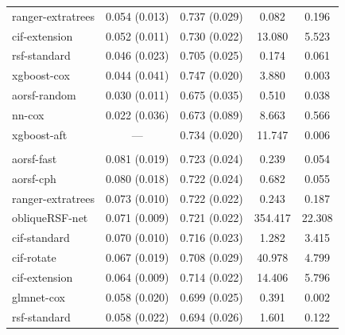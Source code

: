\documentclass[12pt]{article}\usepackage[]{graphicx}\usepackage[]{xcolor}
\newenvironment{knitrout}{}{} %
\begin{document}
\begin{knitrout}
\begin{longtable}[t]{lcccc}
\hspace{1em}ranger-extratrees & 0.054 (0.013) & 0.737 (0.029) & 0.082 & 0.196\\
\hspace{1em}cif-extension & 0.052 (0.011) & 0.730 (0.022) & 13.080 & 5.523\\
\hspace{1em}rsf-standard & 0.046 (0.023) & 0.705 (0.025) & 0.174 & 0.061\\
\hspace{1em}xgboost-cox & 0.044 (0.041) & 0.747 (0.020) & 3.880 & 0.003\\
\hspace{1em}aorsf-random & 0.030 (0.011) & 0.675 (0.035) & 0.510 & 0.038\\
\hspace{1em}nn-cox & 0.022 (0.036) & 0.673 (0.089) & 8.663 & 0.566\\
\hspace{1em}xgboost-aft & --- & 0.734 (0.020) & 11.747 & 0.006\\
\addlinespace[0.3em]
\multicolumn{5}{l}{\textit{\textbf{GUIDE-IT; HF hospitalization, n = 894, p = 59}}}\\
\hline
\hspace{1em}aorsf-fast & 0.081 (0.019) & 0.723 (0.024) & 0.239 & 0.054\\
\hspace{1em}aorsf-cph & 0.080 (0.018) & 0.722 (0.024) & 0.682 & 0.055\\
\hspace{1em}ranger-extratrees & 0.073 (0.010) & 0.722 (0.022) & 0.243 & 0.187\\
\hspace{1em}obliqueRSF-net & 0.071 (0.009) & 0.721 (0.022) & 354.417 & 22.308\\
\hspace{1em}cif-standard & 0.070 (0.010) & 0.716 (0.023) & 1.282 & 3.415\\
\hspace{1em}cif-rotate & 0.067 (0.019) & 0.708 (0.029) & 40.978 & 4.799\\
\hspace{1em}cif-extension & 0.064 (0.009) & 0.714 (0.022) & 14.406 & 5.796\\
\hspace{1em}glmnet-cox & 0.058 (0.020) & 0.699 (0.025) & 0.391 & 0.002\\
\hspace{1em}rsf-standard & 0.058 (0.022) & 0.694 (0.026) & 1.601 & 0.122\\

\end{longtable}
\end{knitrout}
\end{document}
